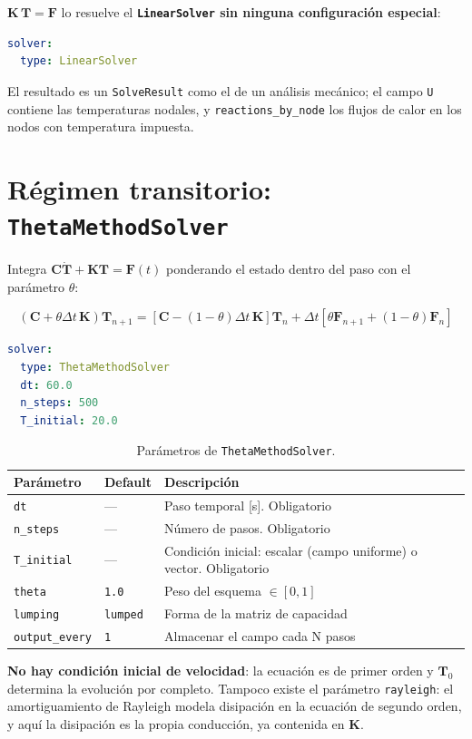 \documentclass[11pt,oneside]{report}
\begin{document}
$\mathbf K\,\mathbf T = \mathbf F$ lo resuelve el \textbf{\texttt{LinearSolver} sin ninguna configuración especial}:

\begin{lstlisting}[language=yaml]
solver:
  type: LinearSolver

\end{lstlisting}

El resultado es un \texttt{SolveResult} como el de un análisis mecánico; el campo \texttt{U} contiene las temperaturas nodales, y \texttt{reactions\_\allowbreak{}by\_\allowbreak{}node} los flujos de calor en los nodos con temperatura impuesta.

\section{Régimen transitorio: \texttt{ThetaMethodSolver}}

Integra $\mathbf C\dot{\mathbf T} + \mathbf K\mathbf T = \mathbf F(t)$ ponderando el estado dentro del paso con el parámetro $\theta$:

\[
\left(\mathbf C + \theta\Delta t\,\mathbf K\right)\mathbf T_{n+1} = \left[\mathbf C - (1-\theta)\Delta t\,\mathbf K\right]\mathbf T_n + \Delta t\left[\theta\mathbf F_{n+1} + (1-\theta)\mathbf F_n\right]
\]

\begin{lstlisting}[language=yaml]
solver:
  type: ThetaMethodSolver
  dt: 60.0
  n_steps: 500
  T_initial: 20.0

\end{lstlisting}

\begin{table}[h]
\centering
\caption{Parámetros de \texttt{ThetaMethodSolver}.}
\begin{tabularx}{\textwidth}{YYY}
\hline
\textbf{Parámetro} & \textbf{Default} & \textbf{Descripción} \\
\hline
\texttt{dt} & --- & Paso temporal [s]. Obligatorio \\
\texttt{n\_steps} & --- & Número de pasos. Obligatorio \\
\texttt{T\_initial} & --- & Condición inicial: escalar (campo uniforme) o vector. Obligatorio \\
\texttt{theta} & \texttt{1.0} & Peso del esquema $\in [0,1]$ \\
\texttt{lumping} & \texttt{\textquotedbl{}lumped\textquotedbl{}} & Forma de la matriz de capacidad \\
\texttt{output\_every} & \texttt{1} & Almacenar el campo cada N pasos \\
\hline
\end{tabularx}
\end{table}
\textbf{No hay condición inicial de velocidad}: la ecuación es de primer orden y $\mathbf T_0$ determina la evolución por completo. Tampoco existe el parámetro \texttt{rayleigh}: el amortiguamiento de Rayleigh modela disipación en la ecuación de segundo orden, y aquí la disipación es la propia conducción, ya contenida en $\mathbf K$.
\end{document}
